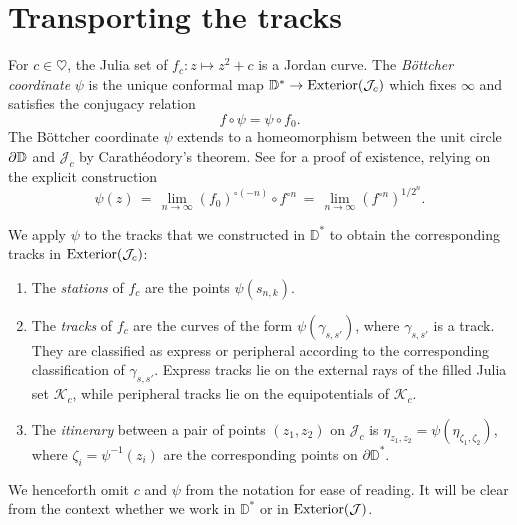 \section{Transporting the tracks} \label{rails-section}
For $c \in \heartsuit$, the Julia set of $f_c: z\mapsto z^2+c$ is a Jordan curve. The {\em Böttcher coordinate} $\psi$ is the unique conformal map $\mathbb{D}^{*}\to\operatorname{Exterior}(\mathcal{J}_c)$  which fixes $\infty$ and satisfies the conjugacy relation 
$$
f\circ\psi=\psi\circ f_{0}.
$$
The Böttcher coordinate $\psi$ extends to a homeomorphism between the unit circle $\partial\mathbb{D}$ and $\mathcal{J}_c$ by Carathéodory's
theorem. See \cite[Theorem 9.5]{milnor_book} for a proof of existence, 
relying on the explicit construction 
\begin{equation}
	\psi(z) \, = \, \lim_{n\to \infty} (f_0)^{\circ (-n)} \circ f^{\circ n}\, = \, \lim_{n\to \infty} {(f^{\circ n})}^{1/2^n}.	
\end{equation}



We apply $\psi$ to the tracks that we constructed in $\mathbb D^*$ 
to obtain the corresponding tracks in $\operatorname{Exterior}(\mathcal{J}_c)$:
\begin{definition} \leavevmode
\begin{enumerate}
	\item The 	\emph{stations} of $f_c$ are the points $\psi(s_{n,k})$.


\item The \emph{tracks} of $f_c$ are the curves of the form $\psi (\gamma_{s,s'})$, where $\gamma_{s,s'}$ is a track. They are classified as express or peripheral according to the corresponding classification of $\gamma_{s,s'}$. 
Express tracks lie on the external rays of the filled Julia set $\mathcal K_c$, while peripheral tracks lie on the equipotentials of $\mathcal K_c$.

\item The \emph{itinerary} between a pair of points $(z_1,z_2)$ on $\mathcal J_c$ is
$\eta_{z_1,z_2}=\psi(\eta_{\zeta_1,\zeta_2})$, 
where $\zeta_i=\psi^{-1}(z_i)$ are the corresponding points on $\partial \mathbb D^*$. 
\end{enumerate}

We henceforth omit $c$ and $\psi$ from the notation for ease of reading. It will be clear from the context whether we work in $\mathbb D^*$ or in $\operatorname{Exterior}(\mathcal J)$.

\end{definition}

